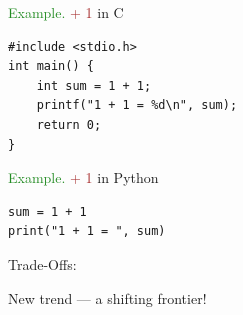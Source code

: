 \documentclass[
    xcolor={svgnames,dvipsnames},
    hyperref={colorlinks, citecolor=DeepPink4, linkcolor=DarkRed, urlcolor=DarkBlue}
    ]{beamer}  %
\newcommand{\Eg}{\textcolor{ForestGreen}{Example. }}
\newcommand{\brown}[1]{\textcolor{Brown}{\sf #1}}
\newcommand{\1}{\mathbbm 1}
\begin{document}
\begin{frame}[fragile]

    \Eg \brown{1 + 1} in C

    {\small
    \begin{verbatim}
#include <stdio.h>
int main() {
    int sum = 1 + 1;
    printf("1 + 1 = %d\n", sum);
    return 0;
}   
    \end{verbatim}
    }

\end{frame}

\begin{frame}[fragile]

    \Eg \brown{1 + 1} in Python

    {\small
    \begin{verbatim}
sum = 1 + 1
print("1 + 1 = ", sum)
    \end{verbatim}
    }

\end{frame}



\begin{frame}

    Trade-Offs:
    
    \begin{figure}
        \centering
    \end{figure}


\end{frame}



\begin{frame}[fragile]

    New trend --- a shifting frontier!

\end{frame}
\end{document}
